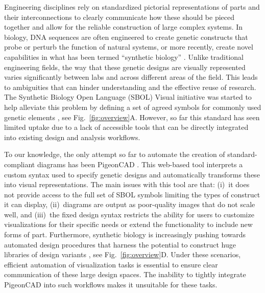 \documentclass{bioinfo}
\begin{document}
Engineering disciplines rely on standardized pictorial representations of parts and their interconnections to clearly communicate how these should be pieced together and allow for the reliable construction of large complex systems. In biology, DNA sequences are often engineered to create genetic constructs that probe or perturb the function of natural systems, or more recently, create novel capabilities in what has been termed ``synthetic biology'' \citep{Church14a}. Unlike traditional engineering fields, the way that these genetic designs are visually represented varies significantly between labs and across different areas of the field. This leads to ambiguities that can hinder understanding and the effective reuse of research. The Synthetic Biology Open Language (SBOL) Visual initiative was started to help alleviate this problem by defining a set of agreed symbols for commonly used genetic elements \citep{Quinn13a}, see Fig.~\ref{fig:overview}A. However, so far this standard has seen limited uptake due to a lack of accessible tools that can be directly integrated into existing design and analysis workflows.

To our knowledge, the only attempt so far to automate the creation of standard-compliant diagrams has been PigeonCAD \citep{Bhatia13a}. This web-based tool interprets a custom syntax used to specify genetic designs and automatically transforms these into visual representations. The main issues with this tool are that: (i)~it does not provide access to the full set of SBOL symbols limiting the types of construct it can display, (ii)~diagrams are output as poor-quality images that do not scale well, and (iii)~the fixed design syntax restricts the ability for users to customize visualizations for their specific needs or extend the functionality to include new forms of part. Furthermore, synthetic biology is increasingly pushing towards automated design procedures that harness the potential to construct huge libraries of design variants \citep{Smanski14a,Bilitchenko11a}, see Fig.~\ref{fig:overview}D. Under these scenarios, efficient automation of visualization tasks is essential to ensure clear communication of these large design spaces. The inability to tightly integrate PigeonCAD into such workflows makes it unsuitable for these tasks.
\end{document}
